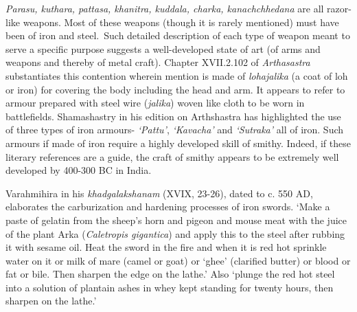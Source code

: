 {\it Parasu, kuthara, pattasa, khanitra, kuddala, charka, kanachchhedana}  are all razor-like weapons. Most of these weapons (though it is rarely mentioned) must have been of iron and steel.~Such detailed description of each type of weapon meant to serve a specific purpose suggests a well-developed state of art (of arms and weapons and thereby of metal craft). Chapter XVII.2.102 of {\it Arthasastra} substantiates this contention wherein mention is made of {\it lohajalika} (a coat of loh or iron) for covering the body including the head and arm. It appears to refer to armour prepared with steel wire ({\it jalika}) woven like cloth to be worn in battlefields. Shamashastry in his edition on Arthshastra has highlighted the use of three types of iron armours- {\it ‘Pattu’}, {\it ‘Kavacha’} and {\it ‘Sutraka’} all of iron. Such armours if made of iron require a highly developed skill of smithy. Indeed, if these literary references are a guide, the craft of smithy appears to be extremely well developed by 400-300 BC in India.

Varahmihira in his {\it khadgalakshanam} (XVIX, 23-26), dated to c. 550 AD, elaborates the carburization and hardening processes of iron swords. ‘Make a paste of gelatin from the sheep’s horn and pigeon and mouse meat with the juice of the plant Arka ({\it Caletropis gigantica}) and apply this to the steel after rubbing it with sesame oil. Heat the sword in the fire and when it is red hot sprinkle water on it or milk of mare (camel or goat) or ‘ghee’ (clarified butter) or blood or fat or bile. Then sharpen the edge on the lathe.’ Also ‘plunge the red hot steel into a solution of plantain ashes in whey kept standing for twenty hours, then sharpen on the lathe.’ 

